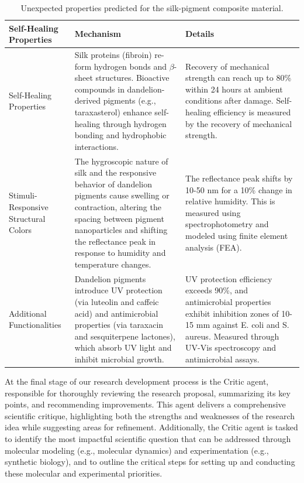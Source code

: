 \documentclass{article}
\begin{document}
\begin{table}[th!]
 \centering
\caption{Unexpected properties predicted for the silk-pigment composite material.}
\begin{tabularx}{1.0\textwidth}{XXX}
\toprule
 \textbf{Self-Healing Properties} & \textbf{Mechanism} & \textbf{Details}
\tabularnewline
\midrule
Self-Healing Properties & Silk proteins (fibroin) re-form hydrogen bonds and $\beta$-sheet structures. Bioactive compounds in dandelion-derived pigments (e.g., taraxasterol) enhance self-healing through hydrogen bonding and hydrophobic interactions.
& Recovery of mechanical strength can reach up to 80\% within 24 hours at ambient conditions after damage. Self-healing efficiency is measured by the recovery of mechanical strength.
\tabularnewline
\midrule
Stimuli-Responsive Structural Colors
& The hygroscopic nature of silk and the responsive behavior of dandelion pigments cause swelling or contraction, altering the spacing between pigment nanoparticles and shifting the reflectance peak in response to humidity and temperature changes.
&
The reflectance peak shifts by 10-50 nm for a 10\% change in relative humidity. This is measured using spectrophotometry and modeled using finite element analysis (FEA).
\tabularnewline
\midrule
Additional Functionalities
& Dandelion pigments introduce UV protection (via luteolin and caffeic acid) and antimicrobial properties (via taraxacin and sesquiterpene lactones), which absorb UV light and inhibit microbial growth.
& UV protection efficiency exceeds 90\%, and antimicrobial properties exhibit inhibition zones of 10-15 mm against E. coli and S. aureus. Measured through UV-Vis spectroscopy and antimicrobial assays.

\tabularnewline
\bottomrule
\end{tabularx}
\label{tbl:unexpected_properties}
\end{table}

At the final stage of our research development process is the Critic agent, responsible for thoroughly reviewing the research proposal, summarizing its key points, and recommending improvements. This agent delivers a comprehensive scientific critique, highlighting both the strengths and weaknesses of the research idea while suggesting areas for refinement. Additionally, the Critic agent is tasked to identify the most impactful scientific question that can be addressed through molecular modeling (e.g., molecular dynamics) and experimentation (e.g., synthetic biology), and to outline the critical steps for setting up and conducting these molecular and experimental priorities.
\end{document}
